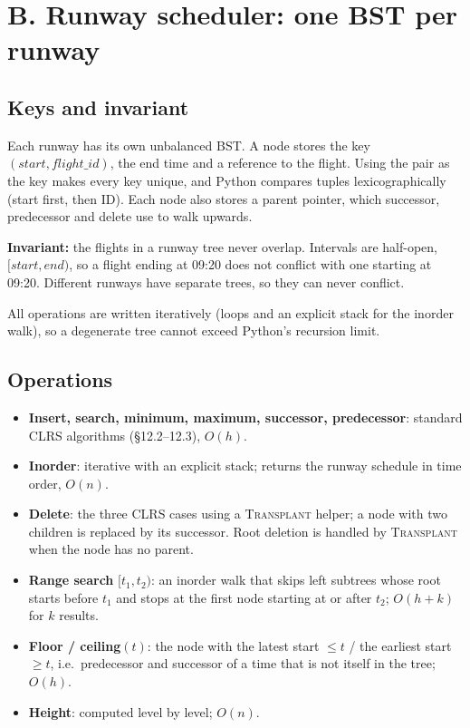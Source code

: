 \documentclass[11pt]{article}
\begin{document}
\section{B. Runway scheduler: one BST per runway}

\subsection{Keys and invariant}
Each runway has its own unbalanced BST. A node stores the key
$(\mathit{start}, \mathit{flight\_id})$, the end time and a reference to the
flight. Using the pair as the key makes every key unique, and Python compares
tuples lexicographically (start first, then ID). Each node also stores a parent
pointer, which successor, predecessor and delete use to walk upwards.

\textbf{Invariant:} the flights in a runway tree never overlap. Intervals are
half-open, $[\mathit{start}, \mathit{end})$, so a flight ending at 09:20 does
not conflict with one starting at 09:20. Different runways have separate trees,
so they can never conflict.

All operations are written iteratively (loops and an explicit stack for the
inorder walk), so a degenerate tree cannot exceed Python's recursion limit.

\subsection{Operations}
\begin{itemize}
  \item \textbf{Insert, search, minimum, maximum, successor, predecessor}:
  standard CLRS algorithms (\S12.2--12.3), $O(h)$.
  \item \textbf{Inorder}: iterative with an explicit stack; returns the runway
  schedule in time order, $O(n)$.
  \item \textbf{Delete}: the three CLRS cases using a \textsc{Transplant} helper;
  a node with two children is replaced by its successor. Root deletion is
  handled by \textsc{Transplant} when the node has no parent.
  \item \textbf{Range search} $[t_1, t_2)$: an inorder walk that skips left
  subtrees whose root starts before $t_1$ and stops at the first node starting
  at or after $t_2$; $O(h + k)$ for $k$ results.
  \item \textbf{Floor / ceiling}$(t)$: the node with the latest start $\le t$ /
  the earliest start $\ge t$, i.e.\ predecessor and successor of a time that is
  not itself in the tree; $O(h)$.
  \item \textbf{Height}: computed level by level; $O(n)$.
\end{itemize}
\end{document}
